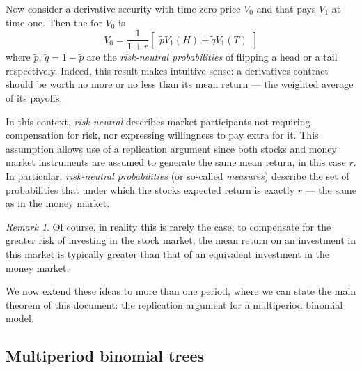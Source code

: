 \documentclass[]{article}
\theoremstyle{remark}
\newtheorem*{remark}{Remark}
\theoremstyle{plain}
\begin{document}
Now consider a derivative security with time-zero price $V_{0}$ and that pays $V_{1}$ at time one. Then the  for $V_{0}$ is
\begin{equation}\label{eq:one_period_formula}
	V_{0} = \frac{1}{1+r}\begin{bmatrix}\tilde{p}V_{1}(H) + \tilde{q}V_{1}(T)\end{bmatrix}
\end{equation}
where $\tilde{p}, \, \tilde{q} = 1-\tilde{p}$ are the \textit{risk-neutral probabilities} of flipping a head or a tail respectively. Indeed, this result makes intuitive sense: a derivatives contract should be worth no more or no less than its mean return --- the weighted average of its payoffs.

In this context, \textit{risk-neutral} describes market participants not requiring compensation for risk, nor expressing willingness to pay extra for it. This assumption allows use of a replication argument since both stocks and money market instruments are assumed to generate the same mean return, in this case $r$. In particular, \textit{risk-neutral probabilities} (or so-called \textit{measures}) describe the set of probabilities that under which the stocks expected return is exactly $r$ --- the same as in the money market.

\begin{remark}
	Of course, in reality this is rarely the case; to compensate for the greater risk of investing in the stock market, the mean return on an investment in this market is typically greater than that of an equivalent investment in the money market.
\end{remark}

We now extend these ideas to more than one period, where we can state the main theorem of this document: the replication argument for a multiperiod binomial model.

\subsection{Multiperiod binomial trees}
\end{document}
